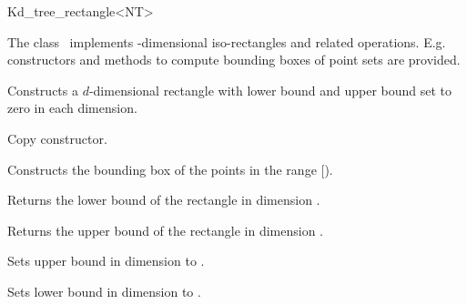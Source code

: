 

\begin{ccRefClass}{Kd_tree_rectangle<NT>}  %


\ccDefinition
  
The class \ccRefName\ implements -dimensional iso-rectangles and related operations.
E.g. constructors and methods to compute bounding boxes of point sets are provided. 



\ccCreation
{}  %



{Constructs a $d$-dimensional rectangle  with lower bound and upper bound set to zero 
in each dimension.}

{Copy constructor.}
 
{Constructs the bounding box of the points in the range [).}



{Returns the lower bound of the rectangle in dimension .}

{Returns the upper bound of the rectangle in dimension .}

\begin{ccAdvanced}

{Sets upper bound in dimension  to .}

{Sets lower bound in dimension  to .}
 

\end{ccAdvanced}
\end{ccRefClass}
